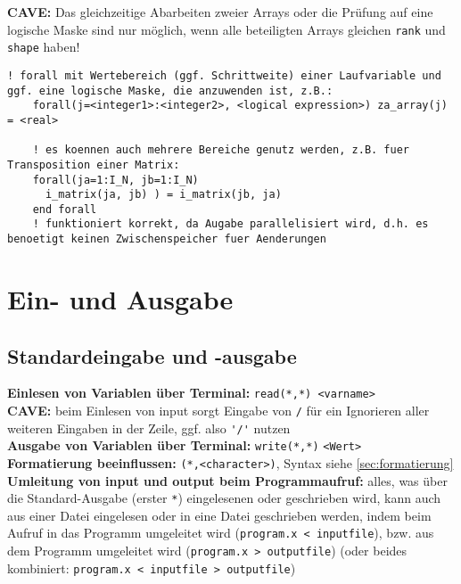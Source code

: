 \documentclass[a4paper, twocolumn]{scrarticle}
\begin{document}
\textbf{CAVE:} Das gleichzeitige Abarbeiten zweier Arrays oder die Prüfung auf eine logische Maske sind nur möglich, wenn alle beteiligten Arrays gleichen \lstinline|rank| und \lstinline|shape| haben!
\begin{lstlisting}[caption={forall-Statement als Parallelisierung von where}]
	! forall mit Wertebereich (ggf. Schrittweite) einer Laufvariable und ggf. eine logische Maske, die anzuwenden ist, z.B.:
	forall(j=<integer1>:<integer2>, <logical expression>) za_array(j) = <real>
	
	! es koennen auch mehrere Bereiche genutz werden, z.B. fuer Transposition einer Matrix:
	forall(ja=1:I_N, jb=1:I_N)
	  i_matrix(ja, jb) ) = i_matrix(jb, ja)
	end forall
	! funktioniert korrekt, da Augabe parallelisiert wird, d.h. es benoetigt keinen Zwischenspeicher fuer Aenderungen
\end{lstlisting}

\section{Ein- und Ausgabe}
\subsection{Standardeingabe und -ausgabe}
\textbf{Einlesen von Variablen über Terminal:} \lstinline|read(*,*) <varname>|\\
\textbf{CAVE:} beim Einlesen von input sorgt Eingabe von \lstinline|/| für ein Ignorieren aller weiteren Eingaben in der Zeile, ggf. also \lstinline|'/'| nutzen\\
\textbf{Ausgabe von Variablen über Terminal:} \lstinline|write(*,*)| \lstinline|<Wert>|\\
\textbf{Formatierung beeinflussen:} \lstinline|(*,<character>)|, Syntax siehe \cref{sec:formatierung}\\
\textbf{Umleitung von input und output beim Programmaufruf:} alles, was über die Standard-Ausgabe (erster \lstinline|*|) eingelesenen oder geschrieben wird, kann auch aus einer Datei eingelesen oder in eine Datei geschrieben werden, indem beim Aufruf in das Programm umgeleitet wird (\lstinline[style=neutral]|program.x < inputfile|), bzw. aus dem Programm umgeleitet wird (\lstinline[style=neutral]|program.x > outputfile|) (oder beides kombiniert: \lstinline[style=neutral]|program.x < inputfile > outputfile|)
\end{document}
